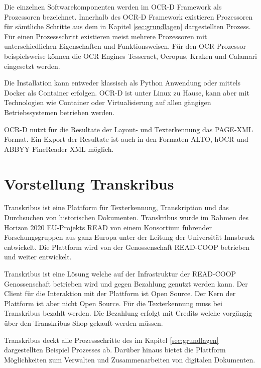 \documentclass[a4paper,oneside, 12pt]{report}
\begin{document}
 Die einzelnen Softwarekomponenten werden im OCR-D Framework als Prozessoren bezeichnet. Innerhalb des OCR-D Framework existieren Prozessoren für sämtliche Schritte aus dem in Kapitel \ref{sec:grundlagen} dargestellten Prozess. Für einen Prozessschritt existieren meist mehrere Prozessoren mit unterschiedlichen Eigenschaften und Funktionsweisen. Für den \ac{OCR} Prozessor beispielsweise können die OCR Engines Tesseract, Ocropus, Kraken und Calamari eingesetzt werden. 

Die Installation kann entweder klassisch als Python Anwendung oder mittels Docker als Container erfolgen. OCR-D ist unter Linux zu Hause, kann aber mit Technologien wie Container oder Virtualisierung auf allen gängigen Betriebssystemen betrieben werden. \cite{ocrdsetup}

OCR-D nutzt für die Resultate der Layout- und Texterkennung das PAGE-XML Format. Ein Export der Resultate ist auch in den Formaten ALTO, hOCR und ABBYY FineReader XML möglich. \cite{ocrdfaq}


\section{Vorstellung Transkribus}
Transkribus ist eine Plattform für Texterkennung, Transkription und das Durchsuchen von historischen Dokumenten. Transkribus wurde im Rahmen des Horizon 2020 EU-Projekts READ von einem Konsortium führender Forschungsgruppen aus ganz Europa unter der Leitung der Universität Innsbruck entwickelt. Die Plattform wird von der Genossenschaft READ-COOP betrieben und weiter entwickelt. \cite{readcoopabout} 

Transkribus ist eine Lösung welche auf der Infrastruktur der READ-COOP Genossenschaft betrieben wird und gegen Bezahlung genutzt werden kann. Der Client für die Interaktion mit der Plattform ist Open Source. Der Kern der Plattform ist aber nicht Open Source. Für die Texterkennung muss bei Transkribus bezahlt werden. Die Bezahlung erfolgt mit Credits welche vorgängig über den Transkribus Shop gekauft werden müssen. \cite{transkribuspricing}

Transkribus deckt alle Prozessschritte des im Kapitel \ref{sec:grundlagen} dargestellten Beispiel Prozesses ab. Darüber hinaus bietet die Plattform Möglichkeiten zum Verwalten und Zusammenarbeiten von digitalen Dokumenten. \cite{transkribus}
\end{document}
